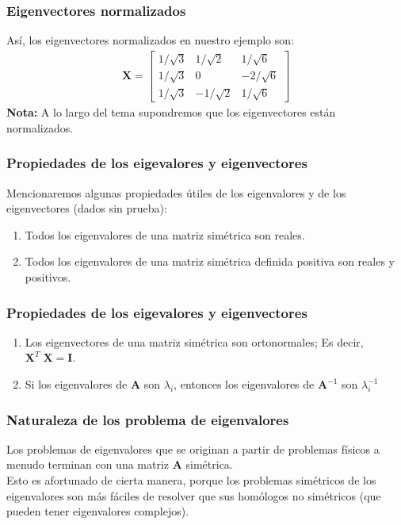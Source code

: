 \documentclass[12pt]{beamer}
\begin{document}
\begin{frame}
\frametitle{Eigenvectores normalizados}
Así, los eigenvectores normalizados en nuestro ejemplo son:
\pause
\begin{align*}
\mathbf{X} = \begin{bmatrix}
1 / \sqrt{3} & 1 / \sqrt{2} & 1 / \sqrt{6} \\
1 / \sqrt{3} & 0 & -2 / \sqrt{6} \\
1 / \sqrt{3} & -1 / \sqrt{2} & 1 / \sqrt{6}
\end{bmatrix}
\end{align*}
\pause
\textbf{Nota:} A lo largo del tema supondremos que los eigenvectores están normalizados.
\end{frame}
\begin{frame}
\frametitle{Propiedades de los eigevalores y eigenvectores}
Mencionaremos algunas propiedades útiles de los eigenvalores y de los eigenvectores (dados sin prueba):
\begin{enumerate}[<+->]
\item Todos los eigenvalores de una matriz simétrica son reales.
\item Todos los eigenvalores de una matriz simétrica definida positiva son reales y positivos.
\seti
\end{enumerate}
\end{frame}
\begin{frame}
\frametitle{Propiedades de los eigevalores y eigenvectores}
\begin{enumerate}[<+->]
\conti
\item Los eigenvectores de una matriz simétrica son ortonormales; Es decir, $\mathbf{X}^{T} \; \mathbf{X} = \mathbf{I}$.
\item Si los eigenvalores de $\mathbf{A}$ son $\lambda_{i}$, entonces los eigenvalores de $\mathbf{A}^{-1}$ son $\lambda_{i}^{-1}$
\end{enumerate}
\end{frame}
\begin{frame}
\frametitle{Naturaleza de los problema de eigenvalores}
Los problemas de eigenvalores que se originan a partir de problemas físicos a menudo terminan con una matriz $\mathbf{A}$ simétrica.
\\
\bigskip
\pause
Esto es afortunado de cierta manera, porque los problemas simétricos de los eigenvalores son más fáciles de resolver que sus homólogos no simétricos (que pueden tener eigenvalores complejos).
\end{frame}
\end{document}
